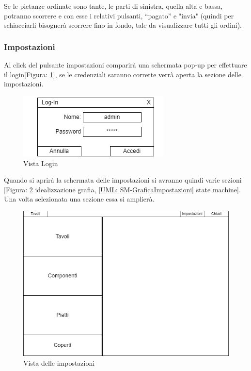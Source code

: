 \documentclass[12pt, letterpaper]{book}
\begin{document}
Se le pietanze ordinate sono tante, le parti di sinistra, quella alta e bassa, potranno scorrere e con esse i relativi pulsanti, “pagato” e "invia" (quindi per schiacciarli bisognerà scorrere fino in fondo, tale da visualizzare tutti gli ordini).

\subsubsection{Impostazioni}
Al click del pulsante impostazioni comparirà una schermata pop-up per effettuare il login[Figura: \ref{Log-in}], se le credenziali saranno corrette verrà aperta la sezione delle impostazioni.
\begin{figure}[H]
    \centering
    \includegraphics[width = 0.5 \linewidth]{../Documentazione/Drawio/VistaLog-in.png}
    \caption{Vista Login}
    \label{Log-in}
\end{figure}

Quando si aprirà la schermata delle impostazioni si avranno quindi varie sezioni [Figura: \ref{impostazioni} idealizzazione grafia, \ref{UML: SM-GraficaImpostazioni} state machine]. Una volta selezionata una sezione essa si amplierà.

\begin{figure}[h]
    \centering
    \includegraphics[width = 0.45 \linewidth]{../Documentazione/Drawio/Impostazioni.png}
    \caption{Vista delle impostazioni}
    \label{impostazioni}
\end{figure}
\end{document}

